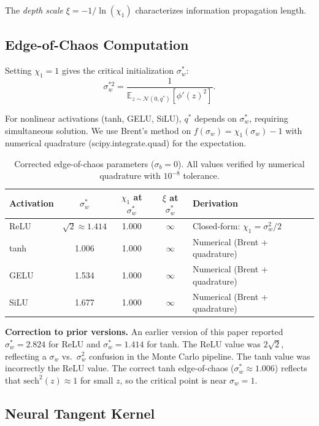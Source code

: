 \documentclass[10pt]{article}
\theoremstyle{definition}
\begin{document}
The \emph{depth scale} $\xi = -1/\ln(\chi_1)$ characterizes information propagation length.

\subsection{Edge-of-Chaos Computation}

Setting $\chi_1 = 1$ gives the critical initialization $\sigma_w^*$:
\begin{equation}
  \sigma_w^{*2} = \frac{1}{\mathbb{E}_{z \sim \mathcal{N}(0, q^*)}[\phi'(z)^2]}.
\end{equation}

For nonlinear activations (tanh, GELU, SiLU), $q^*$ depends on $\sigma_w^*$, requiring simultaneous solution.
We use Brent's method on $f(\sigma_w) = \chi_1(\sigma_w) - 1$ with numerical quadrature (scipy.integrate.quad) for the expectation.

\begin{table}[t]
\centering
\caption{Corrected edge-of-chaos parameters ($\sigma_b = 0$). All values verified by numerical quadrature with $10^{-8}$ tolerance.}
\label{tab:activation}
\begin{tabular}{lcccl}
\toprule
Activation & $\sigma_w^*$ & $\chi_1$ at $\sigma_w^*$ & $\xi$ at $\sigma_w^*$ & Derivation \\
\midrule
ReLU & $\sqrt{2} \approx 1.414$ & 1.000 & $\infty$ & Closed-form: $\chi_1 = \sigma_w^2/2$ \\
tanh & 1.006 & 1.000 & $\infty$ & Numerical (Brent + quadrature) \\
GELU & 1.534 & 1.000 & $\infty$ & Numerical (Brent + quadrature) \\
SiLU & 1.677 & 1.000 & $\infty$ & Numerical (Brent + quadrature) \\
\bottomrule
\end{tabular}
\end{table}

\noindent\textbf{Correction to prior versions.}
An earlier version of this paper reported $\sigma_w^* = 2.824$ for ReLU and $\sigma_w^* = 1.414$ for tanh.
The ReLU value was $2\sqrt{2}$, reflecting a $\sigma_w$ vs.\ $\sigma_w^2$ confusion in the Monte Carlo pipeline.
The tanh value was incorrectly the ReLU value.
The correct tanh edge-of-chaos ($\sigma_w^* \approx 1.006$) reflects that $\text{sech}^2(z) \approx 1$ for small $z$, so the critical point is near $\sigma_w = 1$.

\subsection{Neural Tangent Kernel}
\end{document}
